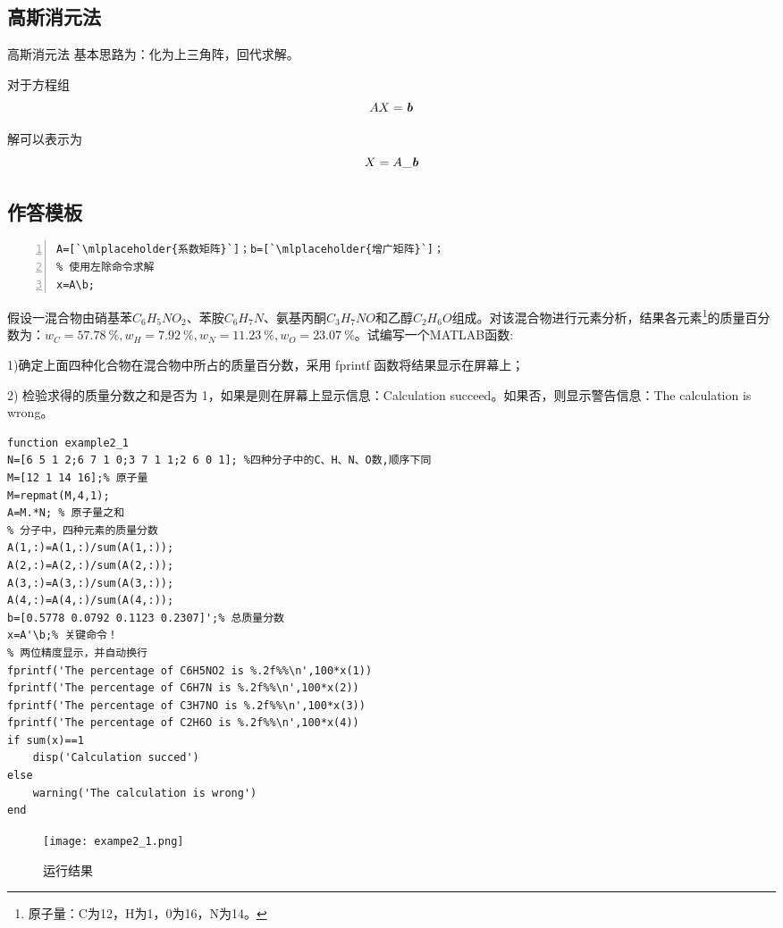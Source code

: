 \subsection{高斯消元法}
\begin{definition}{高斯消元法}{}
基本思路为：化为上三角阵，回代求解。
\end{definition}

对于方程组
\[
AX=\emph{\textbf{b}}
\]

解可以表示为
\[
X=A\_\emph{\textbf{b}}
\]
\subsection{作答模板}
\begin{lstlisting}[frame=single,numbers=left]
% 得到所需矩阵A、b，注意对齐方式！
A=[`\mlplaceholder{系数矩阵}`]；b=[`\mlplaceholder{增广矩阵}`]；
% 使用左除命令求解
x=A\b;
\end{lstlisting}
\begin{problem}
假设一混合物由硝基苯$C_6H_5NO_2$、苯胺$C_6H_7N$、氨基丙酮$C_3H_7NO$和乙醇$C_2H_6O$组成。对该混合物进行元素分析，结果各元素\footnote{原子量：C为12，H为1，0为16，N为14。}的质量百分数为：$w_C=\SI{57.78}{\percent},w_H= \SI{7.92}{\percent},w_N= \SI{11.23}{\percent},w_O= \SI{23.07}{\percent}$。试编写一个MATLAB函数:

1)确定上面四种化合物在混合物中所占的质量百分数，采用 fprintf 函数将结果显示在屏幕上；

2) 检验求得的质量分数之和是否为 1，如果是则在屏幕上显示信息：Calculation succeed。如果否，则显示警告信息：The calculation is wrong。
\end{problem}

\begin{solution}
\begin{lstlisting}
function example2_1
N=[6 5 1 2;6 7 1 0;3 7 1 1;2 6 0 1]; %四种分子中的C、H、N、O数,顺序下同
M=[12 1 14 16];% 原子量
M=repmat(M,4,1);
A=M.*N; % 原子量之和
% 分子中，四种元素的质量分数
A(1,:)=A(1,:)/sum(A(1,:));
A(2,:)=A(2,:)/sum(A(2,:));
A(3,:)=A(3,:)/sum(A(3,:));
A(4,:)=A(4,:)/sum(A(4,:));
b=[0.5778 0.0792 0.1123 0.2307]';% 总质量分数
x=A'\b;% 关键命令！
% 两位精度显示，并自动换行
fprintf('The percentage of C6H5NO2 is %.2f%%\n',100*x(1))
fprintf('The percentage of C6H7N is %.2f%%\n',100*x(2))
fprintf('The percentage of C3H7NO is %.2f%%\n',100*x(3))
fprintf('The percentage of C2H6O is %.2f%%\n',100*x(4))
if sum(x)==1
    disp('Calculation succed')
else
    warning('The calculation is wrong')
end
\end{lstlisting}

\begin{figure}[htbp]
\centering
\texttt{[image: exampe2\_1.png]}
\caption{运行结果}
\end{figure}

\end{solution}